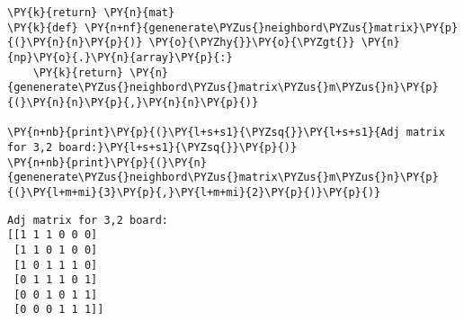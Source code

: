 \begin{english}
\begin{tcolorbox}[breakable, size=fbox, boxrule=1pt, pad at break*=1mm,colback=cellbackground, colframe=cellborder]
\begin{Verbatim}[commandchars=\\\{\}]
    \PY{k}{return} \PY{n}{mat}
\PY{k}{def} \PY{n+nf}{genenerate\PYZus{}neighbord\PYZus{}matrix}\PY{p}{(}\PY{n}{n}\PY{p}{)} \PY{o}{\PYZhy{}}\PY{o}{\PYZgt{}} \PY{n}{np}\PY{o}{.}\PY{n}{array}\PY{p}{:}   
    \PY{k}{return} \PY{n}{genenerate\PYZus{}neighbord\PYZus{}matrix\PYZus{}m\PYZus{}n}\PY{p}{(}\PY{n}{n}\PY{p}{,}\PY{n}{n}\PY{p}{)}

\PY{n+nb}{print}\PY{p}{(}\PY{l+s+s1}{\PYZsq{}}\PY{l+s+s1}{Adj matrix for 3,2 board:}\PY{l+s+s1}{\PYZsq{}}\PY{p}{)}
\PY{n+nb}{print}\PY{p}{(}\PY{n}{genenerate\PYZus{}neighbord\PYZus{}matrix\PYZus{}m\PYZus{}n}\PY{p}{(}\PY{l+m+mi}{3}\PY{p}{,}\PY{l+m+mi}{2}\PY{p}{)}\PY{p}{)}
\end{Verbatim}
\end{tcolorbox}
    \begin{Verbatim}[commandchars=\\\{\}]
Adj matrix for 3,2 board:
[[1 1 1 0 0 0]
 [1 1 0 1 0 0]
 [1 0 1 1 1 0]
 [0 1 1 1 0 1]
 [0 0 1 0 1 1]
 [0 0 0 1 1 1]]
    \end{Verbatim}
\end{english}

